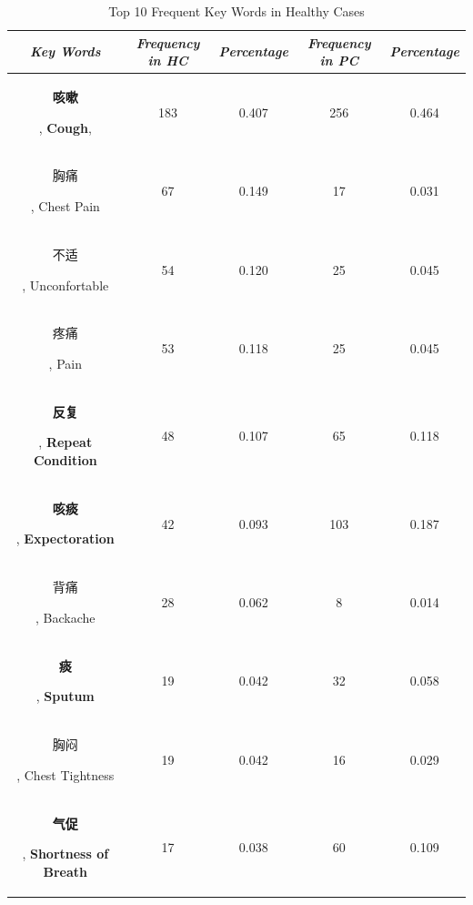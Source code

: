     \begin{table}[htb]
        \vspace{-0cm}
        \caption{Top 10 Frequent Key Words in Healthy Cases}
        \vspace{-0cm}
        \begin{center}
        \begin{tabular}{|c|c|c|c|c|}
            \hline
            \textbf{\textit{Key Words}} & \textbf{\textit{Frequency in HC}} & \textbf{\textit{Percentage}}& \textbf{\textit{Frequency in PC}}& \textbf{\textit{Percentage}} \\
        \hline
        \begin{CJK}{UTF8}{gbsn}\textbf{咳嗽}\end{CJK}, \textbf{Cough},  & 183 & 0.407 & 256 & 0.464\\
        \begin{CJK}{UTF8}{gbsn}胸痛\end{CJK}, Chest Pain & 67 & 0.149 & 17 & 0.031\\
        \begin{CJK}{UTF8}{gbsn}不适\end{CJK}, Unconfortable & 54 & 0.120 & 25 & 0.045\\
        \begin{CJK}{UTF8}{gbsn}疼痛\end{CJK}, Pain & 53 & 0.118 & 25 & 0.045\\
        \begin{CJK}{UTF8}{gbsn}\textbf{反复}\end{CJK}, \textbf{Repeat Condition} & 48 & 0.107 & 65 & 0.118\\
        \begin{CJK}{UTF8}{gbsn}\textbf{咳痰}\end{CJK}, \textbf{Expectoration} & 42 & 0.093 & 103 & 0.187\\
        \begin{CJK}{UTF8}{gbsn}背痛\end{CJK}, Backache & 28 & 0.062 & 8 & 0.014\\
        \begin{CJK}{UTF8}{gbsn}\textbf{痰}\end{CJK}, \textbf{Sputum}& 19 & 0.042 & 32 & 0.058\\
        \begin{CJK}{UTF8}{gbsn}胸闷\end{CJK}, Chest Tightness & 19 & 0.042 & 16 & 0.029\\
        \begin{CJK}{UTF8}{gbsn}\textbf{气促}\end{CJK}, \textbf{Shortness of Breath}& 17 & 0.038 & 60 & 0.109\\
        

\end{tabular}
\end{center}
\end{table}
